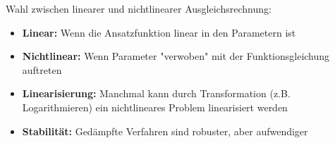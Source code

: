 \begin{KR}{Wahl zwischen linearer und nichtlinearer Ausgleichsrechnung:}
\begin{itemize}
    \item \textbf{Linear:} Wenn die Ansatzfunktion linear in den Parametern ist
    \item \textbf{Nichtlinear:} Wenn Parameter "verwoben" mit der Funktionsgleichung auftreten
    \item \textbf{Linearisierung:} Manchmal kann durch Transformation (z.B. Logarithmieren) ein nichtlineares Problem linearisiert werden
    \item \textbf{Stabilität:} Gedämpfte Verfahren sind robuster, aber aufwendiger
\end{itemize}
\end{KR}

